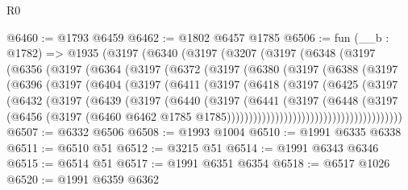 \begin{lexlean}{R0}
\begin{coremodule}
@6460 := @1793 @6459
@6462 := @1802 @6457 @1785
@6506 := fun (__b : @1782) =>
  @1935
    (@3197
      (@6340
        (@3197
          (@3207
            (@3197
              (@6348
                (@3197
                  (@6356
                    (@3197
                      (@6364
                        (@3197
                          (@6372
                            (@3197
                              (@6380
                                (@3197
                                  (@6388
                                    (@3197
                                      (@6396
                                        (@3197
                                          (@6404
                                            (@3197
                                              (@6411
                                                (@3197
                                                  (@6418
                                                    (@3197
                                                      (@6425
                                                        (@3197
                                                          (@6432
                                                            (@3197
                                                              (@6439
                                                                (@3197
                                                                  (@6440
                                                                    (@3197
                                                                      (@6441
                                                                        (@3197
                                                                          (@6448
                                                                            (@3197
                                                                              (@6456
                                                                                (@3197
                                                                                  (@6460
                                                                                    @6462
                                                                                    @1785
                                                                                    @1785))))))))))))))))))))))))))))))))))))))))
@6507 := @6332 @6506
@6508 := @1993 @1004
@6510 := @1991 @6335 @6338
@6511 := @6510 @51
@6512 := @3215 @51
@6514 := @1991 @6343 @6346
@6515 := @6514 @51
@6517 := @1991 @6351 @6354
@6518 := @6517 @1026
@6520 := @1991 @6359 @6362

\end{coremodule}
\end{lexlean}

